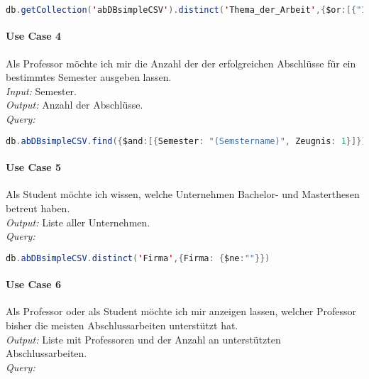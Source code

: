 \begin{lstlisting}[caption={Query zu Use Case 3},language=java,captionpos=t,numbers=none, numberstyle=\tiny,breaklines=true]
db.getCollection('abDBsimpleCSV').distinct('Thema_der_Arbeit',{$or:[{"1_Pruefer":"Professorname"},{"2_Pruefer":"Professorname"},{"3_Pruefer":"Professorname"}]})
\end{lstlisting}\label{lst:query3}

\paragraph{Use Case 4} Als Professor möchte ich mir die Anzahl der der erfolgreichen Abschlüsse für ein bestimmtes Semester ausgeben lassen. \\
\emph{Input:} Semester. \\
\emph{Output:} Anzahl der Abschlüsse. \\
\emph{Query:}

\begin{lstlisting}[caption={Query zu Use Case 4},language=java,captionpos=t,numbers=none, numberstyle=\tiny,breaklines=true]
db.abDBsimpleCSV.find({$and:[{Semester: "(Semstername)", Zeugnis: 1}]}).count()
\end{lstlisting}\label{lst:query4}

\paragraph{Use Case 5} Als Student möchte ich wissen, welche Unternehmen Bachelor- und Masterthesen betreut haben. \\
\emph{Output:} Liste aller Unternehmen. \\
\emph{Query:}

\begin{lstlisting}[caption={Query zu Use Case 5},language=java,captionpos=t,numbers=none, numberstyle=\tiny,breaklines=true]
db.abDBsimpleCSV.distinct('Firma',{Firma: {$ne:""}})
\end{lstlisting}\label{lst:query5}

\paragraph{Use Case 6} Als Professor oder als Student möchte ich mir anzeigen lassen, welcher Professor bisher die meisten Abschlussarbeiten unterstützt hat. \\
\emph{Output:} Liste mit Professoren und der Anzahl an unterstützten Abschlussarbeiten. \\
\emph{Query:}

